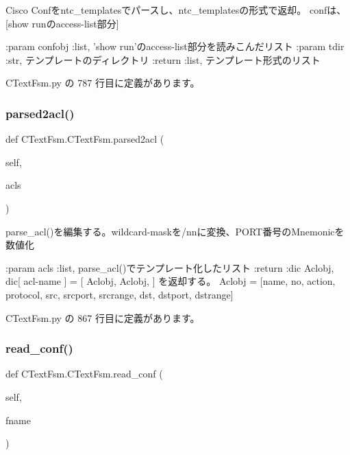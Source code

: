 \begin{DoxyVerb}Cisco Confをntc_templatesでパースし、ntc_templatesの形式で返却。
confは、[show runのaccess-list部分]

:param confobj :list, 'show run'のaccess-list部分を読みこんだリスト
:param tdir    :str, テンプレートのディレクトリ
:return :list, テンプレート形式のリスト
\end{DoxyVerb}
 

 C\+Text\+Fsm.\+py の 787 行目に定義があります。

\mbox{\label{classCTextFsm_1_1CTextFsm_a8b07c128e0344d13bb92a318a25ab625}} 
\subsubsection{\texorpdfstring{parsed2acl()}{parsed2acl()}}
{\footnotesize\ttfamily def C\+Text\+Fsm.\+C\+Text\+Fsm.\+parsed2acl (\begin{DoxyParamCaption}\item[{}]{self,  }\item[{}]{acls }\end{DoxyParamCaption})}

\begin{DoxyVerb}parse_acl()を編集する。wildcard-maskを/nnに変換、PORT番号のMnemonicを数値化

:param  acls  :list, parse_acl()でテンプレート化したリスト
:return :dic Aclobj,
  dic[ acl-name ] = [ Aclobj, Aclobj, ] を返却する。
  Aclobj = [name, no, action, protocol, src, srcport, srcrange, dst, dstport, dstrange]
\end{DoxyVerb}
 

 C\+Text\+Fsm.\+py の 867 行目に定義があります。

\mbox{\label{classCTextFsm_1_1CTextFsm_a6043d2a3f369ecd76cdbd636e6c2e035}} 
\subsubsection{\texorpdfstring{read\_conf()}{read\_conf()}}
{\footnotesize\ttfamily def C\+Text\+Fsm.\+C\+Text\+Fsm.\+read\+\_\+conf (\begin{DoxyParamCaption}\item[{}]{self,  }\item[{}]{fname }\end{DoxyParamCaption})}

